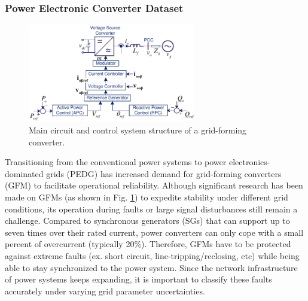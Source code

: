 \subsubsection{Power Electronic Converter Dataset}
 \begin{figure}[H]
	\begin{center}
		\includegraphics[width=0.65\textwidth]{Images/GFMSchema.pdf}
	\end{center}
	\caption{Main circuit and control system structure of a grid-forming converter.}
	\label{fig:sys}
\end{figure}

Transitioning from the conventional power systems to power electronics-dominated grids (PEDG) has increased demand for grid-forming converters (GFM) to facilitate operational reliability. Although significant research has been made on GFMs (as shown in Fig. \ref{fig:sys}) to expedite stability under different grid conditions, its operation during faults or large signal disturbances still remain a challenge. Compared to synchronous generators (SGs) that can support up to seven times over their rated current, power converters can only cope with a small percent of overcurrent (typically 20\%). Therefore, GFMs have to be protected against extreme faults (ex. short circuit, line-tripping/reclosing, etc) while being able to stay synchronized to the power system. Since the network infrastructure of power systems keeps expanding, it is important to classify these faults accurately under varying grid parameter uncertainties.

